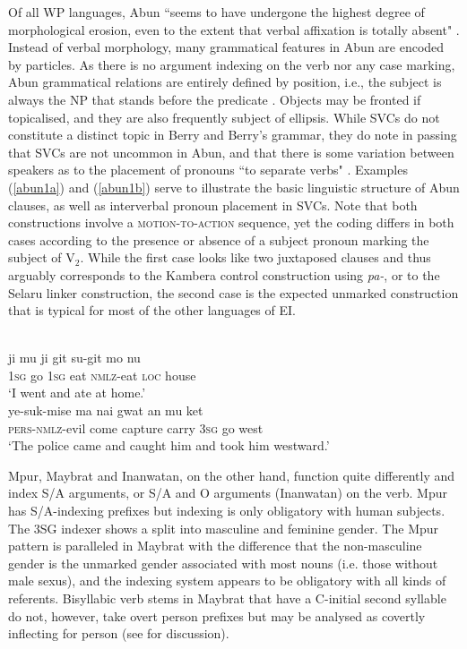 Of all WP languages, Abun ``seems to have undergone the highest degree of morphological erosion, even to the extent that verbal affixation is totally absent" \citep[205]{reesink2005west}. Instead of verbal morphology, many grammatical features in Abun are encoded by particles. As there is no argument indexing on the verb nor any case marking, Abun grammatical relations are entirely defined by position, i.e., the subject is always the NP that stands before the predicate \citep[51]{berry1999}. Objects may be fronted if topicalised, and they are also frequently subject of ellipsis. While SVCs do not constitute a distinct topic in Berry and Berry's grammar, they do note in passing that SVCs are not uncommon in Abun, and that there is some variation between speakers as to the placement of pronouns ``to separate verbs" \citep[51]{berry1999}. Examples (\ref{abun1a}) and (\ref{abun1b}) serve to illustrate the basic linguistic structure of Abun clauses, as well as interverbal pronoun placement in SVCs. Note that both constructions involve a \textsc{motion-to-action} sequence, yet the coding differs in both cases according to the presence or absence of a subject pronoun marking the subject of V$_2$. While the first case looks like two juxtaposed clauses and thus arguably corresponds to the Kambera control construction using \textit{pa-}, or to the Selaru linker construction, the second case is the expected unmarked construction that is typical for most of the other languages of EI.

\ea
{}\\
\ea \label{abun1a}
\gll ji mu ji git su-git mo nu \\
\textsc{1}\textsc{sg} go \textsc{1}\textsc{sg} eat \textsc{nmlz}-eat \textsc{loc} house \\
\glft `I went and ate at home.' \\
\ex \label{abun1b}
\gll ye-suk-mise ma nai gwat an mu ket \\ 
\textsc{pers}-\textsc{nmlz}-evil come capture carry \textsc{3}\textsc{sg} go west \\
\glft `The police came and caught him and took him westward.'
\z
\z

Mpur, Maybrat and Inanwatan, on the other hand, function quite differently and index S/A arguments, or S/A and O arguments (Inanwatan) on the verb. Mpur has S/A-indexing prefixes but indexing is only obligatory with human subjects. The 3SG indexer shows a split into masculine and feminine gender. The Mpur pattern is paralleled in Maybrat with the difference that the non-masculine gender is the unmarked gender associated with most nouns (i.e. those without male sexus), and the indexing system appears to be obligatory with all kinds of referents. Bisyllabic verb stems in Maybrat that have a C-initial second syllable do not, however, take overt person prefixes but may be analysed as covertly inflecting for person (see \citealt[52f.]{dol2007grammar} for discussion).

